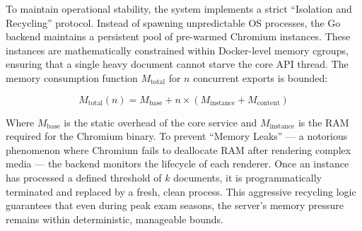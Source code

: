 To maintain operational stability, the system implements a strict ``Isolation and Recycling'' protocol. Instead of spawning unpredictable OS processes, the Go backend maintains a persistent pool of pre-warmed Chromium instances. These instances are mathematically constrained within Docker-level memory cgroups, ensuring that a single heavy document cannot starve the core API thread. The memory consumption function $M_{\text{total}}$ for $n$ concurrent exports is bounded:

\begin{equation}
    M_{\text{total}}(n) = M_{\text{base}} + n \times (M_{\text{instance}} + M_{\text{content}})
\end{equation}

Where $M_{\text{base}}$ is the static overhead of the core service and $M_{\text{instance}}$ is the RAM required for the Chromium binary. To prevent ``Memory Leaks'' — a notorious phenomenon where Chromium fails to deallocate RAM after rendering complex media — the backend monitors the lifecycle of each renderer. Once an instance has processed a defined threshold of $k$ documents, it is programmatically terminated and replaced by a fresh, clean process. This aggressive recycling logic guarantees that even during peak exam seasons, the server’s memory pressure remains within deterministic, manageable bounds.
